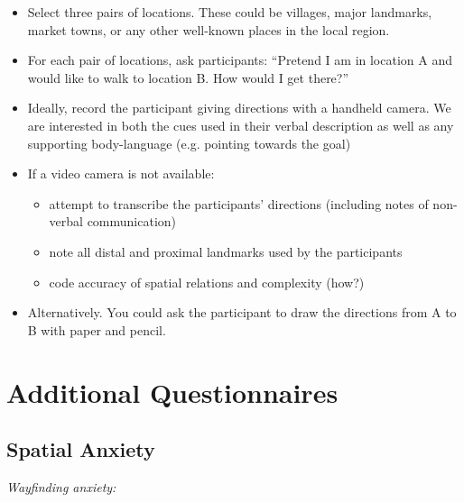 \documentclass{article}
\begin{document}
\begin{itemize}

\item Select three pairs of locations.  These could be villages, major landmarks, market towns, or any other well-known places in the local region.

\item For each pair of locations, ask participants: ``Pretend I am in location A and would like to walk to location B. How would I get there?''

\item Ideally, record the participant giving directions with a handheld camera.  We are interested in both the cues used in their verbal description as well as any supporting body-language (e.g. pointing towards the goal)

\item If a video camera is not available: 
	\begin{itemize}

	\item attempt to transcribe the participants' directions (including notes of non-verbal communication)
	
	\item note all distal and proximal landmarks used by the participants
	
	\item code accuracy of spatial relations and complexity (how?)	
	\end{itemize}
	
\item Alternatively.  You could ask the participant to draw the directions from A to B with paper and pencil.

\end{itemize}


\section{Additional Questionnaires} %

\subsection{Spatial Anxiety} %

\emph{Wayfinding anxiety:}
\end{document}
